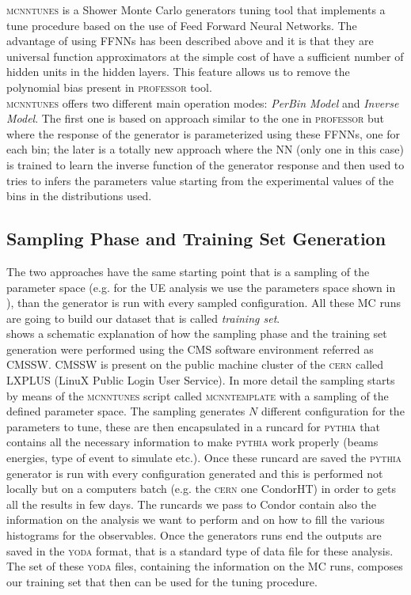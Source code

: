 \textsc{mcnntunes} \cite{MCNNTUNESarticle} is a Shower Monte Carlo generators tuning tool that implements a tune procedure based on the use of Feed Forward Neural Networks. The advantage of using FFNNs has been described above and it is that they are universal function approximators at the simple cost of have a sufficient number of hidden units in the hidden layers. This feature allows us to remove the polynomial bias present in \textsc{professor} tool.
\\
\textsc{mcnntunes} offers two different main operation modes: \textit{PerBin Model} and \textit{Inverse Model}. The first one is based on approach similar to the one in \textsc{professor} but where the response of the generator is parameterized using these FFNNs, one for each bin; the later is a totally new approach where the NN (only one in this case) is trained to learn the inverse function of the generator response and then used to tries to infers the parameters value starting from the experimental values of the bins in the distributions used.
\\

\medskip

\subsection{Sampling Phase and Training Set Generation}

The two approaches have the same starting point that is a sampling of the parameter space (e.g. for the UE analysis we use the parameters space shown in ), than the generator is run with every sampled configuration. 
All these MC runs are going to build our dataset that is called \textit{training set}.
\\
 shows a schematic explanation of how the sampling phase and the training set generation were performed using the CMS software environment referred as CMSSW. CMSSW is present on the public machine cluster of the \textsc{cern} called LXPLUS (LinuX Public Login User Service). 
In more detail the sampling starts by means of the  \textsc{mcnntunes} script called \textsc{mcnntemplate} with a sampling of the defined parameter space. The sampling generates  $N$ different configuration for the parameters to tune, these are then encapsulated in a runcard for \textsc{pythia} that contains all the necessary information to make \textsc{pythia} work properly (beams energies, type of event to simulate etc.). Once these runcard are saved the \textsc{pythia} generator is run with every configuration generated and this is performed not locally but on a computers batch (e.g. the \textsc{cern} one CondorHT) in order to gets all the results in few days. The runcards we pass to Condor contain also the information on the analysis we want to perform and on how to fill the various histograms for the observables. Once the generators runs end the outputs are saved in the \textsc{yoda} format, that is a standard type of data file for these analysis. The set of these \textsc{yoda} files, containing the information on the MC runs, composes our training set that then can be used for the tuning procedure.

